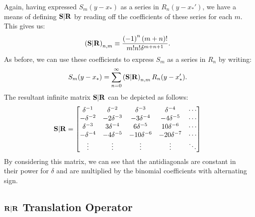 Again, having expressed $S_m(y - x_*)$
as a series in $R_n(y - x_*')$,
we have a means of defining $\bold{S}|\bold{R}$
by reading off the coefficients of these series for each $m$.
This gives us:
\begin{align*}
  \left(\bold{S}|\bold{R}\right)_{n,m} \equiv {\left(-1\right)^n \left(m + n\right)! \over m! n! \delta^{m+n+1}}.
\end{align*}
As before, we can use these coefficients to express $S_m$
as a series in $R_n$
by writing:
\begin{align*}
  S_m(y - x_*) = \sum_{n=0}^\infty \left(\bold{S}|\bold{R}\right)_{n,m} R_n(y - x_*').
\end{align*}
The resultant infinite matrix $\bold{S}|\bold{R}$ can be depicted as follows:
\begin{align*}
  \bold{S}|\bold{R} = \begin{bmatrix}
    \delta^{-1} & \delta^{-2} & \delta^{-3} & \delta^{-4} & \cdots \\
    -\delta^{-2} & -2\delta^{-3} & -3\delta^{-4} & -4\delta^{-5} & \cdots \\
    \delta^{-3} & 3\delta^{-4} & 6 \delta^{-5} & 10 \delta^{-6} & \cdots \\
    -\delta^{-4} & -4 \delta^{-5} & -10 \delta^{-6} & -20 \delta^{-7} & \cdots \\
    \vdots & \vdots & \vdots & \vdots & \ddots
  \end{bmatrix}
\end{align*}
By considering this matrix, we can see that the antidiagonals are
constant in their power for $\delta$
and are multiplied by the binomial coefficients with alternating sign.

\subsection{$\bold{R}|\bold{R}$ Translation Operator}

